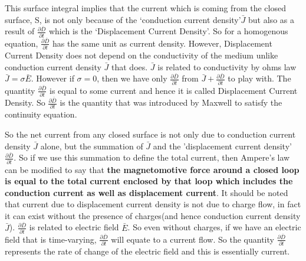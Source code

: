This surface integral implies that the current which is coming from the closed surface, S, is not only because of the \textquoteleft conduction current density\textquoteright $\bar{J}$ but also as a result of $\frac{\partial\bar{D}}{\partial t}$ which is the \textquoteleft Displacement Current Density\textquoteright. So for a homogenous equation, $\frac{\partial\bar{D}}{\partial t}$ has the same unit as current density. However, Displacement Current Density does not depend on the conductivity of the medium unlike conduction current density $\bar{J}$ that does. $\bar{J}$ is related to conductivity by ohms law $\bar{J}=\sigma\bar{E}$. However if $\sigma=0$, then we have only $\frac{\partial\bar{D}}{\partial t}$ from $\bar{J}+\frac{\partial\bar{D}}{\partial t}$ to play with. The quantity $\frac{\partial\bar{D}}{\partial t}$ is equal to some current and hence it is called Displacement Current Density. So $\frac{\partial\bar{D}}{\partial t}$ is the quantity that was introduced by Maxwell to satisfy the continuity equation.

So the net current from any closed surface is not only due to conduction current density $\bar{J}$ alone, but the summation of $\bar{J}$ and the 'displacement current density' $\frac{\partial\bar{D}}{\partial t}$. So if we use this summation to define the total current, then Ampere's law can be modified to say that \textbf{the magnetomotive force around a closed loop is equal to the total current enclosed by that loop which includes the conduction current as well as displacement current}. It should be noted that current due to displacement current density is not due to charge flow, in fact it can exist without the presence of charges(and hence conduction current density $\bar{J}$). $\frac{\partial\bar{D}}{\partial t}$ is related to electric field $\bar{E}$. So even without charges, if we have an electric field that is time-varying, $\frac{\partial\bar{D}}{\partial t}$ will equate to a current flow. So the quantity $\frac{\partial\bar{D}}{\partial t}$ represents the rate of change of the electric field and this is essentially current.

